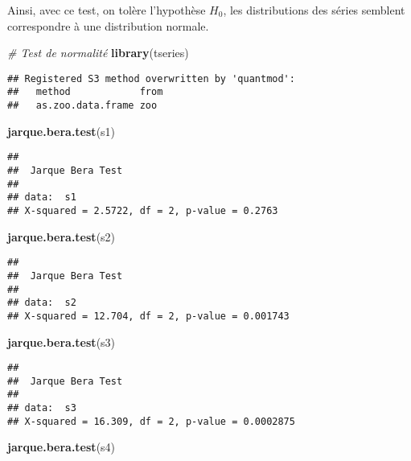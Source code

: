 \documentclass[
]{book}
\newenvironment{Shaded}{\begin{snugshade}}{\end{snugshade}}
\newcommand{\CommentTok}[1]{\textcolor[rgb]{0.56,0.35,0.01}{\textit{#1}}}
\newcommand{\FunctionTok}[1]{\textcolor[rgb]{0.13,0.29,0.53}{\textbf{#1}}}
\newcommand{\NormalTok}[1]{#1}
\theoremstyle{definition}
\theoremstyle{definition}
\theoremstyle{definition}
\theoremstyle{definition}
\theoremstyle{remark}
\begin{document}
Ainsi, avec ce test, on tolère l'hypothèse \(H_0\), les distributions des séries semblent correspondre à une distribution normale.

\begin{Shaded}
\begin{Highlighting}[]
\CommentTok{\# Test de normalité}
\FunctionTok{library}\NormalTok{(tseries)}
\end{Highlighting}
\end{Shaded}

\begin{verbatim}
## Registered S3 method overwritten by 'quantmod':
##   method            from
##   as.zoo.data.frame zoo
\end{verbatim}

\begin{Shaded}
\begin{Highlighting}[]
\FunctionTok{jarque.bera.test}\NormalTok{(s1)}
\end{Highlighting}
\end{Shaded}

\begin{verbatim}
## 
##  Jarque Bera Test
## 
## data:  s1
## X-squared = 2.5722, df = 2, p-value = 0.2763
\end{verbatim}

\begin{Shaded}
\begin{Highlighting}[]
\FunctionTok{jarque.bera.test}\NormalTok{(s2)}
\end{Highlighting}
\end{Shaded}

\begin{verbatim}
## 
##  Jarque Bera Test
## 
## data:  s2
## X-squared = 12.704, df = 2, p-value = 0.001743
\end{verbatim}

\begin{Shaded}
\begin{Highlighting}[]
\FunctionTok{jarque.bera.test}\NormalTok{(s3)}
\end{Highlighting}
\end{Shaded}

\begin{verbatim}
## 
##  Jarque Bera Test
## 
## data:  s3
## X-squared = 16.309, df = 2, p-value = 0.0002875
\end{verbatim}

\begin{Shaded}
\begin{Highlighting}[]
\FunctionTok{jarque.bera.test}\NormalTok{(s4)}
\end{Highlighting}
\end{Shaded}
\end{document}
